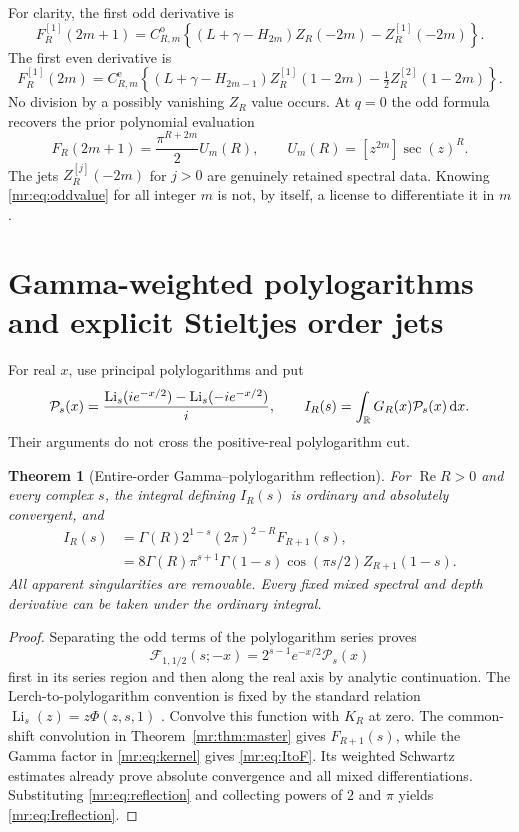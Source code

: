 \documentclass[11pt,letterpaper]{article}
\newtheorem{theorem}{Theorem}[section]
\theoremstyle{definition}\newtheorem{definition}[theorem]{Definition}
\theoremstyle{remark}\newtheorem{remark}[theorem]{Remark}
\newcommand{\Rea}{\operatorname{Re}}\newcommand{\Ima}{\operatorname{Im}}
\newcommand{\Li}{\operatorname{Li}}\newcommand{\Fp}{\operatorname{Fp}}
\newcommand{\dd}{\,\mathrm d}\newcommand{\M}{\mathcal M}
\newcommand{\F}{\mathcal F}\newcommand{\B}{\mathcal B}
\begin{document}
For clarity, the first odd derivative is
\begin{equation}\label{mr:eq:odd1}
 F_R^{[1]}(2m+1)=C_{R,m}^{\mathrm o}
 \left\{(L+\gamma-H_{2m})Z_R(-2m)-Z_R^{[1]}(-2m)\right\}.
\end{equation}
The first even derivative is
\begin{equation}\label{mr:eq:even1}
 F_R^{[1]}(2m)=C_{R,m}^{\mathrm e}
 \left\{(L+\gamma-H_{2m-1})Z_R^{[1]}(1-2m)
                       -\tfrac12Z_R^{[2]}(1-2m)\right\}.
\end{equation}
No division by a possibly vanishing $Z_R$ value occurs.
At $q=0$ the odd formula recovers the prior polynomial evaluation
\begin{equation}\label{mr:eq:oddvalue}
 F_R(2m+1)=\frac{\pi^{R+2m}}2U_m(R),\qquad
 U_m(R)=[z^{2m}]\sec(z)^R.
\end{equation}
The jets $Z_R^{[j]}(-2m)$ for $j>0$ are genuinely retained spectral
data. Knowing \eqref{mr:eq:oddvalue} for all integer $m$ is not, by
itself, a license to differentiate it in $m$.

\section{Gamma-weighted polylogarithms and explicit Stieltjes order jets}
\label{mr:sec:polylog}
For real $x$, use principal polylogarithms and put
\begin{equation}\label{mr:eq:polyodd}
 \mathcal P_s(x)=\frac{\Li_s(ie^{-x/2})-\Li_s(-ie^{-x/2})}{i},
 \qquad I_R(s)=\int_\R G_R(x)\mathcal P_s(x)\dd x.
\end{equation}
Their arguments do not cross the positive-real polylogarithm cut.

\begin{theorem}[Entire-order Gamma--polylogarithm reflection]\label{mr:thm:polylog}
For $\Rea R>0$ and every complex $s$, the integral defining $I_R(s)$
is ordinary and absolutely convergent, and
\begin{align}
 I_R(s)&=\Gamma(R)2^{1-s}(2\pi)^{2-R}F_{R+1}(s),
 \label{mr:eq:ItoF}\\
 &=8\Gamma(R)\pi^{s+1}\Gamma(1-s)
           \cos(\pi s/2)Z_{R+1}(1-s).
 \label{mr:eq:Ireflection}
\end{align}
All apparent singularities are removable. Every fixed mixed spectral
and depth derivative can be taken under the ordinary integral.
\end{theorem}
\begin{proof}
Separating the odd terms of the polylogarithm series proves
\[
 \F_{1,1/2}(s;-x)=2^{s-1}e^{-x/2}\mathcal P_s(x)
\]
first in its series region and then along the real axis by analytic
continuation. The Lerch-to-polylogarithm convention is fixed by the
standard relation $\Li_s(z)=z\Phi(z,s,1)$ \cite{Lerch,Polylog}.
Convolve this function with $K_R$ at zero. The common-shift convolution
in Theorem~\ref{mr:thm:master} gives $F_{R+1}(s)$, while the
Gamma factor in \eqref{mr:eq:kernel} gives \eqref{mr:eq:ItoF}.
Its weighted Schwartz estimates already prove absolute convergence
and all mixed differentiations. Substituting \eqref{mr:eq:reflection}
and collecting powers of $2$ and $\pi$ yields
\eqref{mr:eq:Ireflection}.
\end{proof}
\end{document}
